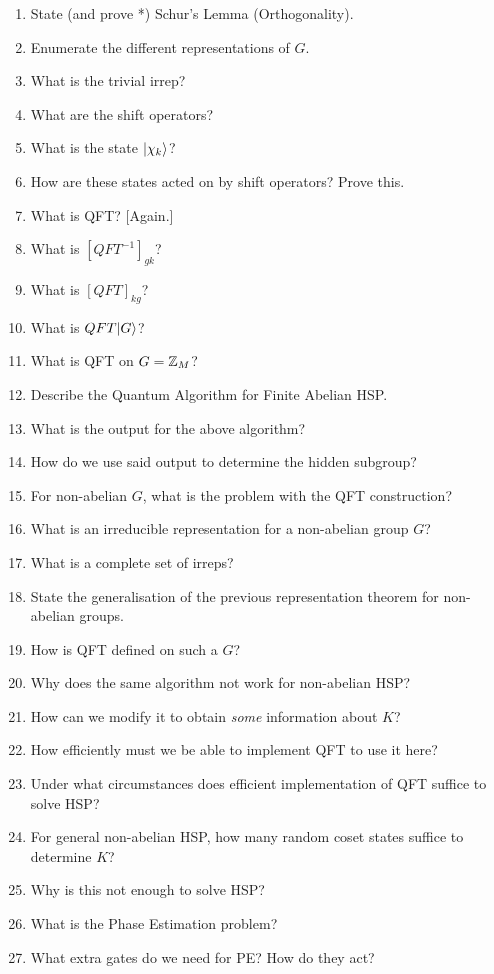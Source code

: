 \documentclass[]{article}
\begin{document}
\begin{enumerate}
    \item State (and prove *) Schur's Lemma (Orthogonality).
    \item Enumerate the different representations of $G$.
    \item What is the trivial irrep?
    \item What are the shift operators?
    \item What is the state $\lvert\chi_k\rangle$?
    \item How are these states acted on by shift operators? Prove this.
    \item What is QFT? [Again.]
    \item What is $[QFT^{-1}]_{gk}$?
    \item What is $[QFT]_{kg}$?
    \item What is $QFT \lvert G\rangle$?
    \item What is QFT on $G = \mathbb{Z}_M$?
    \item Describe the Quantum Algorithm for Finite Abelian HSP.
    \item What is the output for the above algorithm?
    \item How do we use said output to determine the hidden subgroup?
    \item For non-abelian $G$, what is the problem with the QFT construction?
    \item What is an irreducible representation for a non-abelian group $G$?
    \item What is a complete set of irreps?
    \item State the generalisation of the previous representation theorem for non-abelian groups.
    \item How is QFT defined on such a $G$?
    \item Why does the same algorithm not work for non-abelian HSP?
    \item How can we modify it to obtain \textit{some} information about $K$?
    \item How efficiently must we be able to implement QFT to use it here?
    \item Under what circumstances does efficient implementation of QFT suffice to solve HSP?
    \item For general non-abelian HSP, how many random coset states suffice to determine $K$?
    \item Why is this not enough to solve HSP?
    \item What is the Phase Estimation problem?
    \item What extra gates do we need for PE? How do they act?

\end{enumerate}
\end{document}
